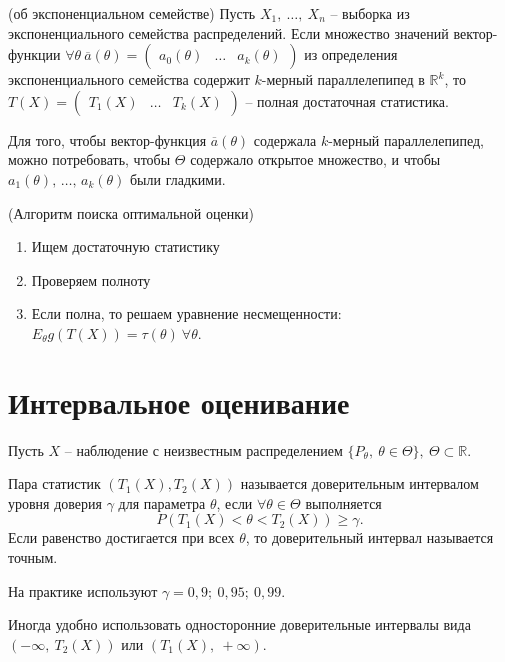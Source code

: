 \begin{theorem}
    (об экспоненциальном семействе) Пусть $\displaystyle X_{1} ,\ \dotsc ,\ X_{n}$ -- выборка из экспоненциального семейства распределений. Если множество значений вектор-функции $\displaystyle \forall \theta \ \overline{a}( \theta ) =\begin{pmatrix}
    a_{0}( \theta ) & \dotsc  & a_{k}( \theta )
    \end{pmatrix}$ из определения экспоненциального семейства содержит $\displaystyle k$-мерный параллелепипед в $\displaystyle \mathbb{R}^{k}$, то $\displaystyle T( X) =\begin{pmatrix}
    T_{1}( X) & \dotsc  & T_{k}( X)
    \end{pmatrix}$ -- полная достаточная статистика.
\end{theorem}
\begin{note}
    Для того, чтобы вектор-функция $\overline{a}(\theta)$ содержала $k$-мерный параллелепипед, можно потребовать, чтобы $\Theta$ содержало открытое множество, и чтобы $a_1(\theta),\, \ldots,\, a_k(\theta)$ были гладкими.
\end{note}

\begin{proposition}
    (Алгоритм поиска оптимальной оценки)
    \begin{enumerate}
    \item Ищем достаточную статистику
    \item Проверяем полноту
    \item Если полна, то решаем уравнение несмещенности: $\displaystyle E_{\theta } g( T( X)) =\tau ( \theta ) \ \forall \theta $.
    \end{enumerate}
\end{proposition}

\section{Интервальное оценивание}

Пусть $\displaystyle X$ -- наблюдение с неизвестным распределением $\displaystyle \{P_{\theta } ,\ \theta \in \Theta \} ,\ \Theta \subset \mathbb{R}$. 

\begin{definition}
    Пара статистик $\displaystyle ( T_{1}( X) ,T_{2}( X))$ называется доверительным интервалом уровня доверия $\displaystyle \gamma $ для параметра $\displaystyle \theta $, если $\displaystyle \forall \theta \in \Theta $ выполняется
\begin{equation*}
    P( T_{1}( X) < \theta < T_{2}( X)) \geqslant \gamma .
\end{equation*}
Если равенство достигается при всех $\displaystyle \theta $, то доверительный интервал называется точным.
\end{definition}
\begin{note}
    На практике используют $\displaystyle \gamma =0,9;\ 0,95;\ 0,99$.
\end{note}
Иногда удобно использовать односторонние доверительные интервалы вида $\displaystyle ( -\infty ,\ T_{2}( X))$ или $\displaystyle ( T_{1}( X) ,\ +\infty )$.

